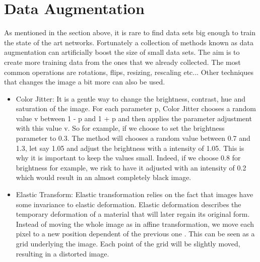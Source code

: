\section{Data Augmentation} \label{sec:dataug}
As mentioned in the section above, it is rare to find data sets big enough to train the state of the art networks. Fortunately a collection of methods known as data augmentation can artificially boost the size of small data sets. The aim is to create more training data from the ones that we already collected. The most common operations are rotations, flips, resizing, rescaling etc... Other techniques that changes the image a bit more can also be used.
\begin{itemize}
    \item Color Jitter: It is a gentle way to change the brightness, contrast, hue and saturation of the image. 
    For each parameter p, Color Jitter chooses a random value v between 1 - p and 1 + p and then applies the parameter adjustment with this value v. So for example, if we choose to set the brightness parameter to 0.3. The method will chooses a random value between 0.7 and 1.3, let say 1.05 and adjust the brightness with a intensity of 1.05. This is why it is important to keep the values small. Indeed, if we choose 0.8 for brightness for example, we risk to have it adjusted with an intensity of 0.2 which would result in an almost completely black image.
     \item Elastic Transform:   Elastic transformation relies on the fact  that images have some invariance to elastic deformation. Elastic deformation describes the temporary deformation of a material that will later regain its original form. Instead of moving the whole image as in affine transformation, we move each pixel to a new position dependent of the previous one \cite{elastic}. This can be seen as a grid underlying the image. Each point of the grid will be slightly moved, resulting in a distorted image. 
     \end{itemize}